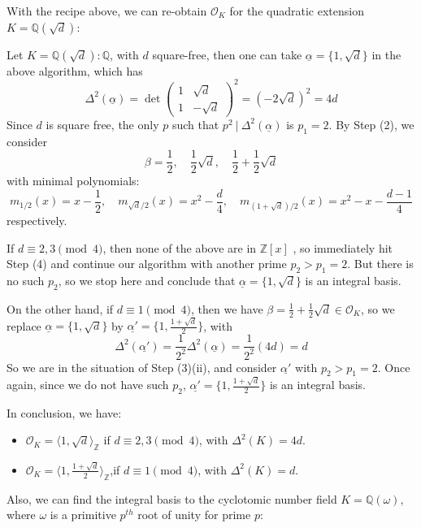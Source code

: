 \bigskip
With the recipe above, we can re-obtain $\mathcal{O}_K$ for the quadratic extension $K=\mathbb{Q}(\sqrt{d})$:
\begin{example}
    Let $K=\mathbb{Q}(\sqrt{d}):\mathbb{Q} $, with $d$ square-free, then one can take $\underline{\alpha} = \{1,\sqrt{d}\}$ in the above algorithm, which has
    $$\Delta^2(\underline{\alpha})= \det\begin{pmatrix}
        1 & \sqrt{d} \\ 1 & -\sqrt{d}
    \end{pmatrix}^2 = (-2\sqrt{d})^2 = 4d$$
    Since $d$ is square free, the only $p$ such that $p^2\ |\ \Delta^2(\underline{\alpha})$ is $p_1 = 2$. By Step (2), we consider
    $$\beta = \frac{1}{2}, \quad \frac{1}{2}\sqrt{d}, \quad \frac{1}{2} + \frac{1}{2}\sqrt{d}$$
    with minimal polynomials:
    $$m_{1/2}(x)=x-\frac12, \quad m_{\sqrt d/2}(x)=x^2-\frac{d}{4}, \quad m_{(1+\sqrt d)/2}(x)=x^2-x-\frac{d-1}{4}$$
    respectively. 
    
    If $d \equiv 2,3 \pmod{4}$, then none of the above are in $\mathbb{Z}[x]$ , so immediately hit Step (4) and continue our algorithm with another prime $p_2 > p_1 = 2$. But there is no such $p_2$, so we stop here and conclude that $\underline{\alpha} = \{1,\sqrt{d}\}$ is an integral basis.
    
    On the other hand, if $d \equiv 1 \pmod{4}$, then 
    we have $\beta = \frac{1}{2} + \frac{1}{2}\sqrt{d} \in \mathcal{O}_K$, so we replace $\underline{\alpha}=\{1,\sqrt{d}\}$ by $\underline{\alpha'}=\{1,\frac{1+\sqrt{d}}{2}\}$, with 
    $$\Delta^2(\underline{\alpha'})= \frac{1}{2^2}\Delta^2(\underline{\alpha}) = \frac{1}{2^2}(4d)= d$$
    So we are in the situation of Step (3)(ii), and consider $\underline{\alpha'}$ with $p_2 > p_1 = 2$. Once again, since we do not have such $p_2$, $\underline{\alpha'} = \{1,\frac{1+\sqrt{d}}{2}\}$ is an integral basis.

    In conclusion, we have:
    \begin{itemize}
        \item $\mathcal{O}_K=\langle1,\sqrt{d}\rangle_{\mathbb{Z}}$ if $d\equiv2,3 \pmod{4}$, with $\Delta^2(K) = 4d$.
        \item $\mathcal{O}_K=\langle 1,\frac{1+\sqrt{d}}{2}\rangle_{\mathbb{Z}}$,if $d\equiv 1 \pmod{4}$, with $\Delta^2(K) = d$.
    \end{itemize}


\end{example}
Also, we can find the integral basis to the cyclotomic number field $K=\mathbb{Q}(\omega)$, where $\omega$ is a primitive $p^{th}$ root of unity for prime $p$:
